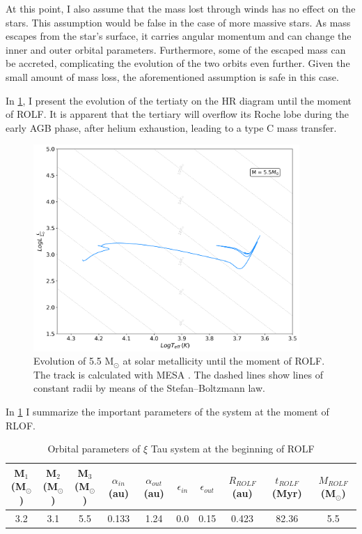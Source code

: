 At this point, I also assume that the mass lost through winds has no effect on the stars. This assumption would be false in the case of more massive stars. As mass escapes from the star's surface, it carries angular momentum and can change the inner and outer orbital parameters. Furthermore, some of the escaped mass can be accreted, complicating the evolution of the two orbits even further. Given the small amount of mass loss, the aforementioned assumption is safe in this case.

In \cref{fig:HR_ROLF}, I present the evolution of the tertiaty on the HR diagram until the moment of ROLF. It is apparent that the tertiary will overflow its Roche lobe during the early AGB phase, after helium exhaustion, leading to a type C mass transfer.
\begin{figure}[H]
    \centering
    \includegraphics[width=0.9\textwidth]{Thesis/graphs/HR_1-1ROLF.pdf}
    \caption{Evolution of 5.5 M$_{\odot}$ at solar metallicity until the moment of ROLF. The track is calculated with MESA \citep{paxton2010modules,paxton2013modules,paxton2015modules,paxton2019modules}. The dashed lines show lines of constant radii by means of the Stefan–Boltzmann law.}
    \label{fig:HR_ROLF}
\end{figure}
In \cref{tab:system_orbit_param_ROLF} I summarize the important parameters of the system at the moment of RLOF. 
\begin{table}[H]
    \begin{adjustbox}{width=1\textwidth}
    \small
    \centering
    \begin{tabular}{| c c c c c c c c c c|}
       M$_1$ (M$_{\odot}$) & 
       M$_2$ (M$_{\odot}$) &
       M$_3$ (M$_{\odot}$) & $\alpha_{in}$ (au) &
       $\alpha_{out}$ (au) &
       $\epsilon_{in}$ &
       $\epsilon_{out}$ &
       $R_{ROLF}$ (au) &
       $t_{ROLF}$ (Myr) &
       $M_{ROLF}$  (M$_{\odot}$) \\
       \hline
       3.2 & 3.1 & 5.5 & 0.133 & 1.24 & 0.0 & 0.15 & 0.423 & 82.36 & 5.5
    \end{tabular}
    \end{adjustbox}
    \caption{ Orbital parameters of $\xi$ Tau system at the beginning of ROLF}
    \label{tab:system_orbit_param_ROLF}
\end{table}
